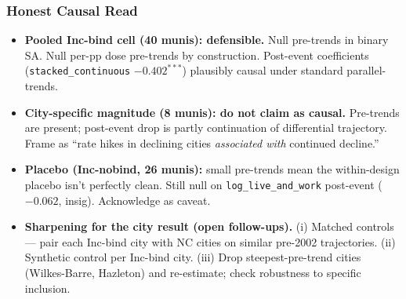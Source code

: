 \documentclass[xcolor = x11names, compress, aspectratio = 169]{beamer}
\begin{document}
    \begin{frame}
    \frametitle{Honest Causal Read}
        \footnotesize
        \begin{itemize}\setlength{\itemsep}{0.10cm}
            \item \textbf{Pooled Inc-bind cell (40 munis): defensible.} Null
            pre-trends in binary SA. Null per-pp dose pre-trends by
            construction. Post-event coefficients (\texttt{stacked\_continuous}
            $-0.402^{***}$) plausibly causal under standard parallel-trends.
            \item \textbf{City-specific magnitude (8 munis): \alert{do not claim
            as causal}.} Pre-trends are present; post-event drop is partly
            continuation of differential trajectory. Frame as ``rate hikes in
            declining cities \emph{associated with} continued decline.''
            \item \textbf{Placebo (Inc-nobind, 26 munis):} small pre-trends mean
            the within-design placebo isn't perfectly clean. Still null on
            \texttt{log\_live\_and\_work} post-event ($-0.062$, insig).
            Acknowledge as caveat.
            \item \textbf{Sharpening for the city result (open follow-ups).}
            (i) Matched controls --- pair each Inc-bind city with NC cities
            on similar pre-2002 trajectories.
            (ii) Synthetic control per Inc-bind city.
            (iii) Drop steepest-pre-trend cities (Wilkes-Barre, Hazleton)
            and re-estimate; check robustness to specific inclusion.
        \end{itemize}
    \end{frame}
\end{document}
